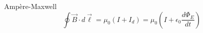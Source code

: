 \begin{lem}{Ampère-Maxwell}
    \begin{equation*}
        \oint \Vec{B} \cdot d\Vec{\ell} = \mu_0 ( I + I_d ) = \mu_0 \left( I + \epsilon_0 \frac{d\Phi_E}{dt} \right)
    \end{equation*}
\end{lem}